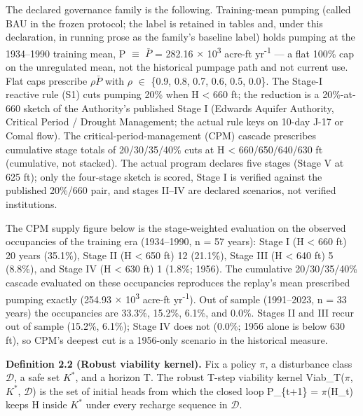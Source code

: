 \documentclass[11pt]{article}
\begin{document}
The declared governance family is the following. Training-mean pumping
(called BAU in the frozen protocol; the label is retained in tables and,
under this declaration, in running prose as the family's baseline label)
holds pumping at the 1934--1990 training mean, P \ensuremath{\equiv} \(\bar{P}\) = 282.16 \ensuremath{\times} 10\textsuperscript{3}
acre-ft yr\textsuperscript{-1} --- a flat 100\% cap on the unregulated mean, not the
historical pumpage path and not current use. Flat caps prescribe \ensuremath{\rho}\(\bar{P}\) with
\ensuremath{\rho} \ensuremath{\in} \{0.9, 0.8, 0.7, 0.6, 0.5, 0.0\}. The Stage-I reactive rule (S1)
cuts pumping 20\% when H \textless{} 660 ft; the reduction is a
20\%-at-660 sketch of the Authority's published Stage I (Edwards Aquifer
Authority, Critical Period / Drought Management; the actual rule keys on
10-day J-17 or Comal flow). The critical-period-management (CPM) cascade
prescribes cumulative stage totals of 20/30/35/40\% cuts at H
\textless{} 660/650/640/630 ft (cumulative, not stacked). The actual
program declares five stages (Stage V at 625 ft); only the four-stage
sketch is scored, Stage I is verified against the published 20\%/660
pair, and stages II--IV are declared scenarios, not verified
institutions.

The CPM supply figure below is the stage-weighted evaluation on the
observed occupancies of the training era (1934--1990, n = 57 years):
Stage I (H \textless{} 660 ft) 20 years (35.1\%), Stage II (H
\textless{} 650 ft) 12 (21.1\%), Stage III (H \textless{} 640 ft) 5
(8.8\%), and Stage IV (H \textless{} 630 ft) 1 (1.8\%; 1956). The
cumulative 20/30/35/40\% cascade evaluated on these occupancies
reproduces the replay's mean prescribed pumping exactly (254.93 \ensuremath{\times} 10\textsuperscript{3}
acre-ft yr\textsuperscript{-1}). Out of sample (1991--2023, n = 33 years) the occupancies
are 33.3\%, 15.2\%, 6.1\%, and 0.0\%. Stages II and III recur out of
sample (15.2\%, 6.1\%); Stage IV does not (0.0\%; 1956 alone is below
630 ft), so CPM's deepest cut is a 1956-only scenario in the historical
measure.

\textbf{Definition 2.2 (Robust viability kernel).} Fix a policy \ensuremath{\pi}, a
disturbance class \(\mathcal{D}\), a safe set \(K^{\ast}\), and a horizon T. The
robust T-step viability kernel Viab\_T(\ensuremath{\pi}, \(K^{\ast}\), \(\mathcal{D}\)) is the set of
initial heads from which the closed loop P\_\{t+1\} = \ensuremath{\pi}(H\_t) keeps H
inside \(K^{\ast}\) under every recharge sequence in \(\mathcal{D}\).
\end{document}
